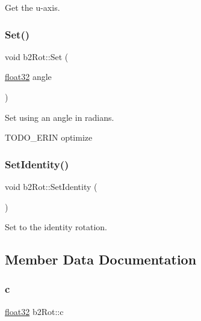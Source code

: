 Get the u-\/axis. 

\mbox{\label{structb2_rot_acde9186de0a4a7397bf8ef714408ad60}} 
\subsubsection{\texorpdfstring{Set()}{Set()}}
{\footnotesize\ttfamily void b2\+Rot\+::\+Set (\begin{DoxyParamCaption}\item[{\mbox{\hyperlink{b2_settings_8h_aacdc525d6f7bddb3ae95d5c311bd06a1}{float32}}}]{angle }\end{DoxyParamCaption})\hspace{0.3cm}{\ttfamily [inline]}}



Set using an angle in radians. 

T\+O\+D\+O\+\_\+\+E\+R\+IN optimize \mbox{\label{structb2_rot_a7f534cb7ece8d325662d7d0e27d4f617}} 
\subsubsection{\texorpdfstring{SetIdentity()}{SetIdentity()}}
{\footnotesize\ttfamily void b2\+Rot\+::\+Set\+Identity (\begin{DoxyParamCaption}{ }\end{DoxyParamCaption})\hspace{0.3cm}{\ttfamily [inline]}}



Set to the identity rotation. 



\subsection{Member Data Documentation}
\mbox{\label{structb2_rot_af23e5d31889dcb806ce46ce55aa81261}} 
\subsubsection{\texorpdfstring{c}{c}}
{\footnotesize\ttfamily \mbox{\hyperlink{b2_settings_8h_aacdc525d6f7bddb3ae95d5c311bd06a1}{float32}} b2\+Rot\+::c}

